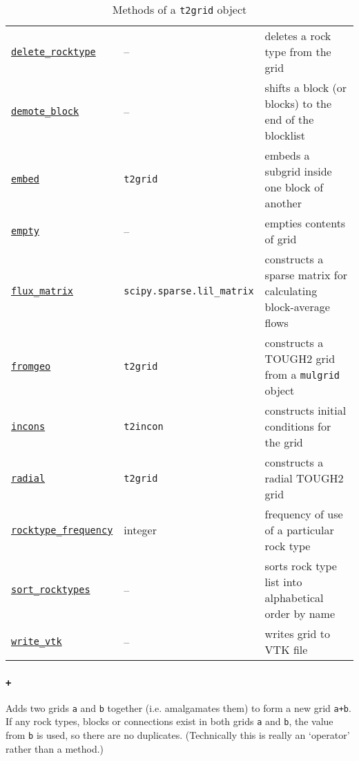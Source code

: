 \begin{table}
\begin{center}
\begin{tabular}{|l|l|p{65mm}|}
      \hyperref[sec:t2grid:delete_rocktype]{\texttt{delete\_rocktype}} & -- & deletes a rock type from the grid\\
      \hyperref[sec:t2grid:demote_block]{\texttt{demote\_block}} & -- & shifts a block (or blocks) to the end of the blocklist\\
      \hyperref[sec:t2grid:embed]{\texttt{embed}} & \texttt{t2grid} & embeds a subgrid inside one block of another \\
      \hyperref[sec:t2grid:empty]{\texttt{empty}} & -- & empties contents of grid\\
      \hyperref[sec:t2grid:flux_matrix]{\texttt{flux\_matrix}} & \texttt{scipy.sparse.lil\_matrix} & constructs a sparse matrix for calculating block-average flows \\
      \hyperref[sec:t2grid:fromgeo]{\texttt{fromgeo}} & \texttt{t2grid} & constructs a TOUGH2 grid from a \texttt{mulgrid} object\\
      \hyperref[sec:t2grid:incons]{\texttt{incons}} & \texttt{t2incon} & constructs initial conditions for the grid\\
      \hyperref[sec:t2grid:radial]{\texttt{radial}} & \texttt{t2grid} & constructs a radial TOUGH2 grid\\
      \hyperref[sec:t2grid:rocktype_frequency]{\texttt{rocktype\_frequency}} & integer & frequency of use of a particular rock type\\
      \hyperref[sec:t2grid:sort_rocktypes]{\texttt{sort\_rocktypes}} & -- & sorts rock type list into alphabetical order by name\\
      \hyperref[sec:t2grid:write_vtk]{\texttt{write\_vtk}} & -- & writes grid to VTK file\\
      \hline
    \end{tabular}
    \caption{Methods of a \texttt{t2grid} object}
    \label{tb:t2grid_methods}
  \end{center}
\end{table}

\begin{snugshade}
\subsubsection{\texttt{+}}
\end{snugshade}
\label{sec:t2grid:plus}

Adds two grids \texttt{a} and \texttt{b} together (i.e. amalgamates them) to form a new grid \texttt{a+b}.  If any rock types, blocks or connections exist in both grids \texttt{a} and \texttt{b}, the value from \texttt{b} is used, so there are no duplicates.  (Technically this is really an `operator' rather than a method.)

